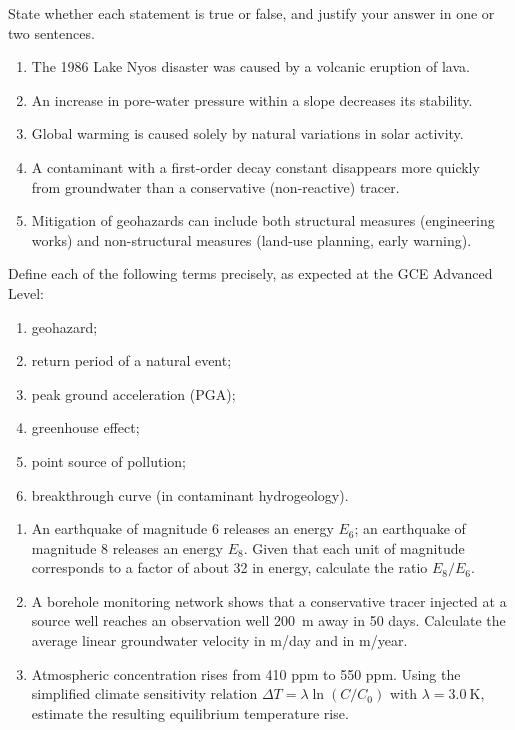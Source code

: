 \documentclass[11pt]{article}
\begin{document}
\begin{exercice}
State whether each statement is true or false, and justify your answer in one or two sentences.
\begin{enumerate}
\item The 1986 Lake Nyos disaster was caused by a volcanic eruption of lava.
\item An increase in pore-water pressure within a slope decreases its stability.
\item Global warming is caused solely by natural variations in solar activity.
\item A contaminant with a first-order decay constant disappears more quickly from groundwater than a conservative (non-reactive) tracer.
\item Mitigation of geohazards can include both structural measures (engineering works) and non-structural measures (land-use planning, early warning).
\end{enumerate}
\end{exercice}

\begin{exercice}
Define each of the following terms precisely, as expected at the GCE Advanced Level:
\begin{enumerate}
\item geohazard;
\item return period of a natural event;
\item peak ground acceleration (PGA);
\item greenhouse effect;
\item point source of pollution;
\item breakthrough curve (in contaminant hydrogeology).
\end{enumerate}
\end{exercice}

\begin{exercice}
\begin{enumerate}
\item An earthquake of magnitude 6 releases an energy $E_6$; an earthquake of magnitude 8 releases an energy $E_8$. Given that each unit of magnitude corresponds to a factor of about 32 in energy, calculate the ratio $E_8/E_6$.
\item A borehole monitoring network shows that a conservative tracer injected at a source well reaches an observation well \SI{200}{m} away in 50 days. Calculate the average linear groundwater velocity in \si{m/day} and in \si{m/year}.
\item Atmospheric  concentration rises from 410 ppm to 550 ppm. Using the simplified climate sensitivity relation $\Delta T = \lambda \ln(C/C_0)$ with $\lambda = \SI{3.0}{\kelvin}$, estimate the resulting equilibrium temperature rise.
\end{enumerate}
\end{exercice}
\end{document}
